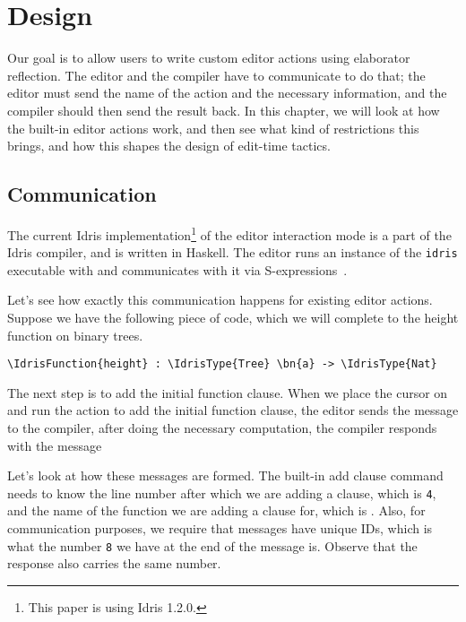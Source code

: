 \section{Design}\label{sec:design}

Our goal is to allow users to write custom editor actions using
elaborator reflection.
The editor and the compiler have to communicate to do that; the editor must
send the name of the action and the necessary information, and the
compiler should then send the result back.
In this chapter, we will look at how the built-in editor actions work, and then
see what kind of restrictions this brings, and how this shapes the design of
edit-time tactics.

\subsection{Communication}\label{sec:communication}

The current Idris implementation\footnote{This paper is using Idris 1.2.0.} of
the editor interaction mode is a part of the Idris compiler, and is written in
Haskell. The editor runs an instance of the \texttt{idris} executable with and
communicates with it via S-expressions~\cite{mccarthy}.

Let's see how exactly this communication happens for existing editor actions.
Suppose we have the following piece of code, which we will complete to the
height function on binary trees.

\begin{Verbatim}
\IdrisFunction{height} : \IdrisType{Tree} \bn{a} -> \IdrisType{Nat}
\end{Verbatim}

The next step is to add the initial function clause.
When we place the cursor on  and run the action to add the initial
function clause, the editor sends the message 
to the compiler, after doing the necessary
computation, the compiler responds with the message 

Let's look at how these messages are formed. The built-in add clause command
needs to know the line number after which we are adding a clause, which is
\texttt{4}, and the name of the function we are adding a clause for, which is
.
Also, for communication purposes, we require that messages have unique IDs,
which is what the number \texttt{8} we have at the end of the message is.
Observe that the response also carries the same number.

